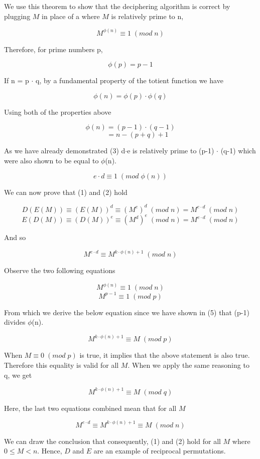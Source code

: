 \documentclass[12pt, letterpaper]{article}
\begin{document}
We use this theorem to show that the deciphering algorithm is correct by plugging $M$ in place of a where $M$ is relatively prime to n,

\begin{equation}
M^{\phi(n)} \equiv 1 \; (mod \; n)
\end{equation}

Therefore, for prime numbers p, 

\[ \phi(p) = p - 1 \]
	
If n = p $\cdot$ q, by a fundamental property of the totient function we have

\[ \phi(n) = \phi(p) \cdot \phi(q) \]

Using both of the properties above

\[ \phi(n) = (p - 1) \cdot (q - 1) \]
\begin{equation}
\qquad = n - (p + q) + 1
\end{equation}

As we have already demonstrated (3) d$\cdot$e is relatively prime to (p-1) $\cdot$ (q-1) which were also shown to be equal to $\phi$(n).

\[ e \cdot d \equiv 1 \; (mod \; \phi(n)) \]

We can now prove that (1) and (2) hold

\[ D(E(M)) \equiv (E(M))^d \equiv (M^e)^d \; (mod \; n) = M^{e \cdot d} \; (mod \; n) \]
\[ E(D(M)) \equiv (D(M))^e \equiv (M^d)^e \; (mod \; n) = M^{e \cdot d} \; (mod \; n) \]

And so

\[ M^{e \cdot d} \equiv M^{k \cdot \phi(n)+1} \; (mod \; n) \]

Observe the two following equations

\[ M^{\phi(n)} \equiv 1 \; (mod \; n) \]
\[ M^{p-1}  \equiv 1 \; (mod \; p) \]

From which we derive the below equation since we have shown in (5) that (p-1) divides $\phi$(n).

\[ M^{k \cdot \phi(n)+1} \equiv M \; (mod \; p)\]

When $M \equiv 0 \; (mod \; p)$ is true, it implies that the above statement is also true. Therefore this equality is valid for all $M$. When we apply the same reasoning to q, we get

\[ M^{k \cdot \phi(n)+1} \equiv M \; (mod \; q) \]

Here, the last two equations combined mean that for all $M$ 

\[ M^{e \cdot d} \equiv M^{k \cdot \phi(n)+1} \equiv M \; (mod \; n) \]

We can draw the conclusion that consequently, (1) and (2) hold for all $M$ where $0 \leq M < n$. Hence, $D$ and $E$ are an example of reciprocal permutations.
\end{document}
